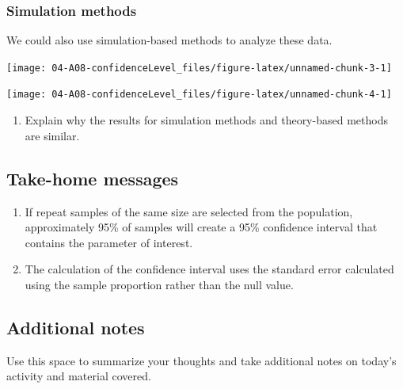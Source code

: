 \documentclass[
]{report}
\providecommand{\tightlist}{%
  \setlength{\itemsep}{0pt}\setlength{\parskip}{0pt}}
\begin{document}
\subsubsection*{Simulation methods}\label{simulation-methods}

We could also use simulation-based methods to analyze these data.

\begin{center}\texttt{[image: 04-A08-confidenceLevel\_files/figure-latex/unnamed-chunk-3-1]} \end{center}

\begin{center}\texttt{[image: 04-A08-confidenceLevel\_files/figure-latex/unnamed-chunk-4-1]} \end{center}

\begin{enumerate}
\def\labelenumi{\arabic{enumi}.}
\setcounter{enumi}{6}
\tightlist
\item
  Explain why the results for simulation methods and theory-based methods are similar.
\end{enumerate}

\vspace{1in}

\subsection{Take-home messages}\label{take-home-messages-7}

\begin{enumerate}
\def\labelenumi{\arabic{enumi}.}
\item
  If repeat samples of the same size are selected from the population, approximately 95\% of samples will create a 95\% confidence interval that contains the parameter of interest.
\item
  The calculation of the confidence interval uses the standard error calculated using the sample proportion rather than the null value.
\end{enumerate}

\subsection{Additional notes}\label{additional-notes-7}

Use this space to summarize your thoughts and take additional notes on today's activity and material covered.

\newpage
\end{document}
